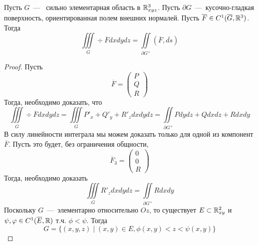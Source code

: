 \begin{theorem}
    Пусть $G$~---~ сильно элементарная область в $\mathbb{R}^3_{xyz}$. Пусть $\partial G$~---~кусочно-гладкая поверхность, ориентированная полем внешних нормалей. Пусть $\overline{F} \in C^1(\overline{G}, \mathbb{R}^3)$. Тогда \[\iiint\limits_{G} \div \overline{F} dxdydz = \iint\limits_{\partial G^+} (\overline{F}, \overline{ds})\]
\end{theorem}
\begin{proof}
    Пусть \[\overline{F} = \begin{pmatrix}
        P \\ Q \\ R
    \end{pmatrix}\]
    Тогда, необходимо доказать, что \[\iiint\limits_G \div \overline{F} dxdydz = \iiint\limits_G P'_x + Q'_y + R'_z dxdydz = \iint\limits_{\partial G^+} Pdydz + Qdxdz + Rdxdy\]
    В силу линейности интеграла мы можем доказать только для одной из компонент $\overline{F}$. Пусть это будет, без ограничения общности, \[\overline{F}_3 = \begin{pmatrix}
        0 \\ 0 \\ R
    \end{pmatrix}\]
    Тогда, необходимо доказать \[\iiint\limits_G R'_z dxdydz = \iint\limits_{\partial G^+} Rdxdy\]
    Поскольку $G$~---~элементарно относительно $Oz$, то существует $E \subset \mathbb{R}^2_{xy}$ и $\psi, \varphi \in C^1(\overline{E}, \mathbb{R})$ т.ч. $\phi < \psi$. Тогда \[G = \{(x, y, z) \mid (x, y) \in E, \phi(x, y) < z < \psi(x, y)\}\]


\end{proof}
